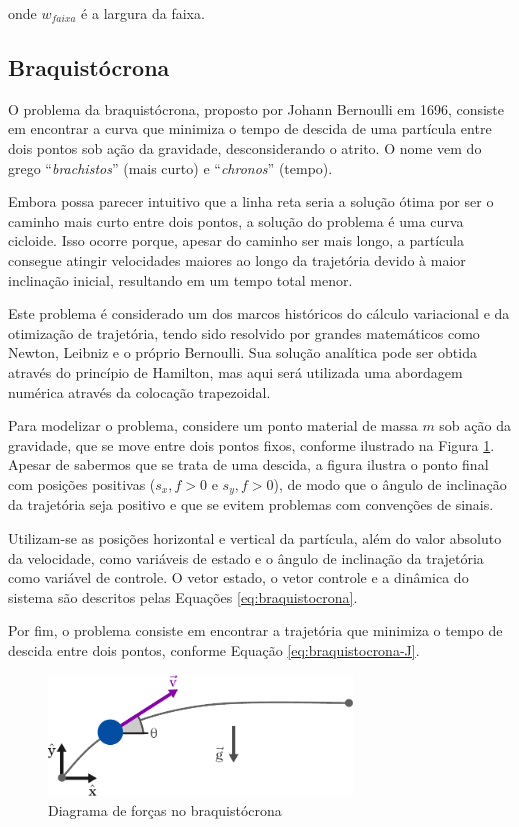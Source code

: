 \noindent onde $w_{faixa}$ é a largura da faixa.


\subsection{Braquistócrona}
\label{subsec:braquistocrona}

O problema da braquistócrona, proposto por Johann Bernoulli em 1696, consiste em encontrar a curva que minimiza o tempo de descida de uma partícula entre dois pontos sob ação da gravidade, desconsiderando o atrito. O nome vem do grego ``\textit{brachistos}'' (mais curto) e ``\textit{chronos}'' (tempo).

Embora possa parecer intuitivo que a linha reta seria a solução ótima por ser o caminho mais curto entre dois pontos, a solução do problema é uma curva cicloide. Isso ocorre porque, apesar do caminho ser mais longo, a partícula consegue atingir velocidades maiores ao longo da trajetória devido à maior inclinação inicial, resultando em um tempo total menor.

Este problema é considerado um dos marcos históricos do cálculo variacional e da otimização de trajetória, tendo sido resolvido por grandes matemáticos como Newton, Leibniz e o próprio Bernoulli. Sua solução analítica pode ser obtida através do princípio de Hamilton, mas aqui será utilizada uma abordagem numérica através da colocação trapezoidal.

Para modelizar o problema, considere um ponto material de massa $m$ sob ação da gravidade, que se move entre dois pontos fixos, conforme ilustrado na Figura \ref{fig:braquistocrona}. Apesar de sabermos que se trata de uma descida, a figura ilustra o ponto final com posições positivas ($s_x,f > 0$ e $s_y,f > 0$), de modo que o ângulo de inclinação da trajetória seja positivo e que se evitem problemas com convenções de sinais.

Utilizam-se as posições horizontal e vertical da partícula, além do valor absoluto da velocidade, como variáveis de estado e o ângulo de inclinação da trajetória como variável de controle. O vetor estado, o vetor controle e a dinâmica do sistema são descritos pelas Equações \ref{eq:braquistocrona}.

Por fim, o problema consiste em encontrar a trajetória que minimiza o tempo de descida entre dois pontos, conforme Equação \ref{eq:braquistocrona-J}.

\begin{figure}[H]
    \centering
    \includegraphics[width=0.72\textwidth]{Cap3/figuras/brachistochrone.pdf}
    \caption{Diagrama de forças no braquistócrona}
    \label{fig:braquistocrona}
\end{figure}

